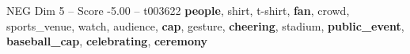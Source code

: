 \begin{textsample}{NEG Dim 5 – Score -5.00 – t003622}  \label{ex:f5_neg_035}
\textbf{people}, shirt, t-shirt, \textbf{fan}, crowd, sports\_venue, watch, audience, \textbf{cap}, gesture, \textbf{cheering}, stadium, \textbf{public\_event}, \textbf{baseball\_cap}, \textbf{celebrating}, \textbf{ceremony}

\end{textsample}
